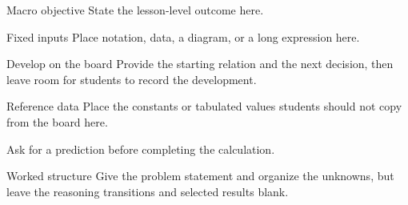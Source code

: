 \documentclass[board]{ne630handout}
\begin{document}
\MakeHandoutTitle

\begin{handoutcolumns}

\begin{fixedbox}{Macro objective}
State the lesson-level outcome here.
\end{fixedbox}


\begin{fixedbox}{Fixed inputs}
Place notation, data, a diagram, or a long expression here.
\end{fixedbox}

\begin{boardbox}{Develop on the board}
Provide the starting relation and the next decision, then leave room for
students to record the development.
\end{boardbox}

\switchcolumn

\begin{fixedbox}{Reference data}
Place the constants or tabulated values students should not copy from the
board here.
\end{fixedbox}

\begin{checkpoint}
Ask for a prediction before completing the calculation.
\end{checkpoint}

\begin{boardbox}{Worked structure}
Give the problem statement and organize the unknowns, but leave the
reasoning transitions and selected results blank.
\end{boardbox}

\end{handoutcolumns}

\newpage
\end{document}
